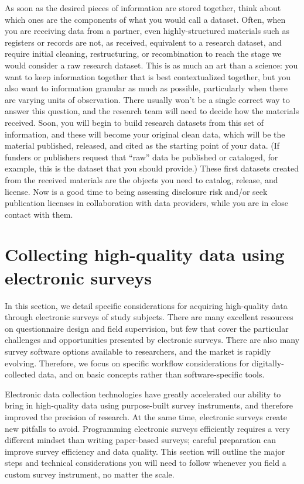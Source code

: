 As soon as the desired pieces of information are stored together,
think about which ones are the components of what you would call a dataset.
Often, when you are receiving data from a partner,
even highly-structured materials such as registers or records
are not, as received, equivalent to a research dataset,
and require initial cleaning, restructuring, or recombination
to reach the stage we would consider a raw research dataset.
This is as much an art than a science:
you want to keep information together that is best contextualized together,
but you also want to information granular as much as possible,
particularly when there are varying units of observation.
There usually won't be a single correct way to answer this question,
and the research team will need to decide how the materials received.
Soon, you will begin to build research datasets from this set of information,
and these will become your original clean data,
which will be the material published, released, and cited
as the starting point of your data.
(If funders or publishers request that ``raw'' data be published or cataloged,
for example, this is the dataset that you should provide.)
These first datasets created from the received materials
are the objects you need to catalog, release, and license.
Now is a good time to being assessing disclosure risk
and/or seek publication licenses in collaboration with data providers,
while you are in close contact with them.





\section{Collecting high-quality data using electronic surveys}
In this section, we detail specific considerations
for acquiring high-quality data through electronic surveys of study subjects.
There are many excellent resources on questionnaire design and field supervision,
but few that cover the particular challenges and opportunities presented by electronic surveys.
There are also many survey software options available to researchers,
and the market is rapidly evolving.
Therefore, we focus on specific workflow considerations for digitally-collected data,
and on basic concepts rather than software-specific tools.

Electronic data collection technologies
have greatly accelerated our ability to bring in high-quality data
using purpose-built survey instruments,
and therefore improved the precision of research.
At the same time, electronic surveys create new pitfalls to avoid.
Programming electronic surveys efficiently requires a very different mindset 
than writing paper-based surveys;
careful preparation can improve survey efficiency and data quality.
This section will outline the major steps and technical considerations
you will need to follow whenever you field a custom survey instrument,
no matter the scale.

